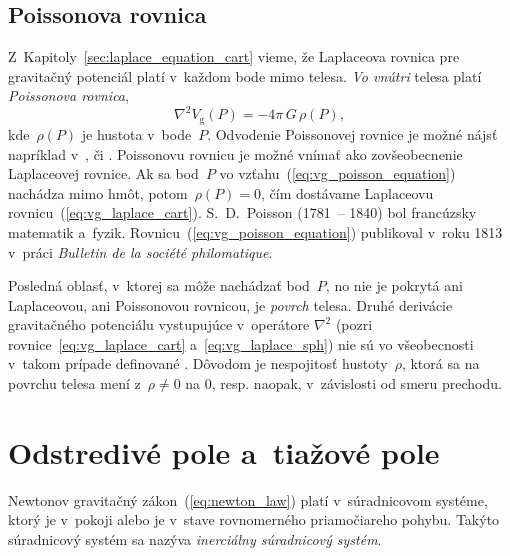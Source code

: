 \documentclass[a4paper, 12pt]{book}
\newcommand{\gidx}{\mathrm g}
\begin{document}
\subsection{Poissonova rovnica}
\label{sec:poisson_equation}

Z~Kapitoly~\ref{sec:laplace_equation_cart} vieme, že Laplaceova rovnica pre
gravitačný potenciál platí v~každom bode mimo telesa.  \emph{Vo vnútri} telesa
platí \emph{Poissonova rovnica},
%
\begin{equation}
\label{eq:vg_poisson_equation}
\nabla^2 V_\gidx(P) = -4 \pi \, G \, \rho(P){,}
\end{equation}
%
kde~$\rho(P)$ je hustota v~bode~$P$.  Odvodenie Poissonovej rovnice je možné 
nájsť napríklad v~\textcite{MacMillan1930}, \textcite{Kellogg1967} či 
\textcite{SansoGeoidDetermination}.  Poissonovu rovnicu je možné vnímať ako 
zovšeobecnenie Laplaceovej rovnice.  Ak sa bod~$P$ vo 
vzťahu~(\ref{eq:vg_poisson_equation}) nachádza mimo hmôt, potom~$\rho(P) = 0$, 
čím dostávame Laplaceovu rovnicu~(\ref{eq:vg_laplace_cart}).  S.~D.~Poisson 
(1781~-- 1840) bol francúzsky matematik a~fyzik.  
Rovnicu~(\ref{eq:vg_poisson_equation}) publikoval v~roku 1813 v~práci 
\textit{Bulletin de la société philomatique}.

Posledná oblasť, v~ktorej sa môže nachádzať bod~$P$, no nie je pokrytá ani 
Laplaceovou, ani Poissonovou rovnicou, je \emph{povrch} telesa.  Druhé 
derivácie gravitačného potenciálu vystupujúce v~operátore $\nabla^2$ (pozri 
rovnice~\ref{eq:vg_laplace_cart} a~\ref{eq:vg_laplace_sph}) nie sú vo 
všeobecnosti v~takom prípade definované \parencite{Kellogg1967}.  Dôvodom je 
nespojitosť hustoty~$\rho$, ktorá sa na povrchu telesa mení z~$\rho \neq 0$ na 
0, resp. naopak, v~závislosti od smeru prechodu.






\section{Odstredivé pole a~tiažové pole}
\label{sec:centrifugal_gravity_field}

Newtonov gravitačný zákon~(\ref{eq:newton_law}) platí v~súradnicovom systéme,
ktorý je v~pokoji alebo je v~stave rovnomerného priamočiareho pohybu.  Takýto
súradnicový systém sa nazýva \emph{inerciálny súradnicový systém}.
\end{document}
